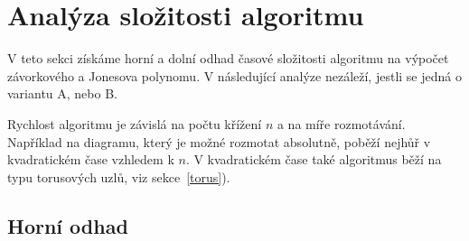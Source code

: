 \section{Analýza složitosti algoritmu}  \label{analyza}
V teto sekci získáme horní a dolní odhad časové složitosti algoritmu na výpočet závorkového a Jonesova polynomu. V následující analýze nezáleží, jestli se jedná o variantu A, nebo B.

Rychlost algoritmu je závislá na počtu křížení $n$ a na míře rozmotávání. Například na diagramu, který je možné rozmotat absolutně, poběží nejhůř v kvadratickém čase vzhledem k $n$. V kvadratickém čase také algoritmus běží na typu torusových uzlů, viz sekce~\ref{torus}).

\subsection{Horní odhad}



